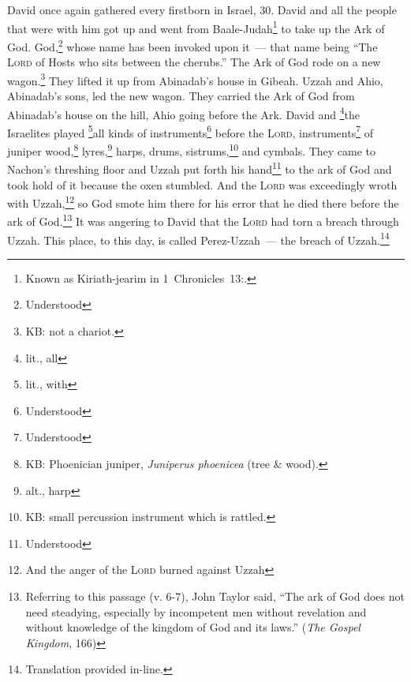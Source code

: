 
\begin{inparaenum}
     David once again gathered every firstborn in Israel, 30.%
     David and all the people that were with him got up and went from Baale-Judah\footnote{Known as Kiriath-jearim in 1~Chronicles~13\thinspace:.} to take up the Ark of God. God,\footnote{Understood} whose name has been invoked upon it~--- that name being ``The \textsc{Lord} of Hosts who sits between the cherubs.''%
     The Ark of God rode on a new wagon.\footnote{KB: not a chariot.} They lifted it up from Abinadab's house in Gibeah. Uzzah and Ahio, Abinadab's sons, led the new wagon.%
     They carried the Ark of God from Abinadab's house on the hill, Ahio going before the Ark.%
     David and \footnote{lit., all}the Israelites played \footnote{lit., with}all kinds of instruments\footnote{Understood} before the \textsc{Lord}, instruments\footnote{Understood} of juniper wood,\footnote{KB: Phoenician juniper, \textit{Juniperus phoenicea} (tree \& wood).} lyres,\footnote{alt., harp} harps, drums, sistrums,\footnote{KB: small percussion instrument which is rattled.} and cymbals.%
     They came to Nachon's threshing floor and Uzzah put forth his hand\footnote{Understood} to the ark of God and took hold of it because the oxen stumbled.%
     And the \textsc{Lord} was exceedingly wroth with Uzzah,\footnote{And the anger of the \textsc{Lord} burned against Uzzah} so God smote him there for his error that he died there before the ark of God.\footnote{Referring to this passage (v. 6-7), John Taylor said, ``The ark of God does not need steadying, especially by incompetent men without revelation and without knowledge of the kingdom of God and its laws.'' (\textit{The Gospel Kingdom}, 166)}%
     It was angering to David that the \textsc{Lord} had torn a breach through Uzzah. This place, to this day, is called Perez-Uzzah~--- the breach of Uzzah.\footnote{Translation provided in-line.}%
\end{inparaenum}
